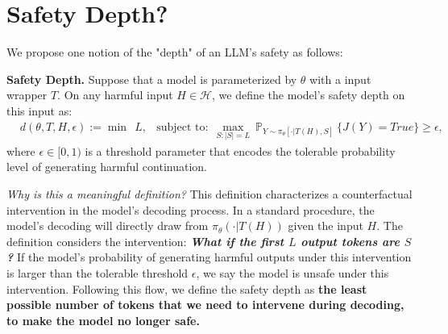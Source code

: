 \newpage
\section{Safety Depth?}
\label{sec:shallow_alignment_notion}



We propose one notion of the "depth" of an LLM's safety as follows:
\begin{definition} \textbf{Safety Depth.} Suppose that a model is parameterized by $\theta$ with a input wrapper $T$. On any harmful input $H \in \mathcal{H}$, we define the model's safety depth on this input as:
\begin{align*}
    & d(\theta, T, H, \epsilon) :=  \mathop{\min} \ \ L, 
    & \text{subject to:}\ \ \max_{S: |S| = L} \ \mathbb{P}_{Y\sim \pi_{\theta}[\cdot|T(H), S]}\  \Bigg\{ J(Y) = True\Bigg\} \ge \epsilon,
\end{align*}
where $\epsilon \in [0,1)$ is a threshold parameter that encodes the tolerable probability level of generating harmful continuation. 
\end{definition}

\textit{Why is this a meaningful definition?} This definition characterizes a counterfactual intervention in the model's decoding process. In a standard procedure, the model's decoding will directly draw from $\pi_{\theta}(\cdot | T(H))$ given the input $H$. The definition considers the intervention: \textbf{\textit{What if the first $L$ output tokens are $S$?}} If the model's probability of generating harmful outputs under this intervention is larger than the tolerable threshold $\epsilon$, we say the model is unsafe under this intervention. Following this flow, we define the safety depth as \textbf{the least possible number of tokens that we need to intervene during decoding, to make the model no longer safe.}



